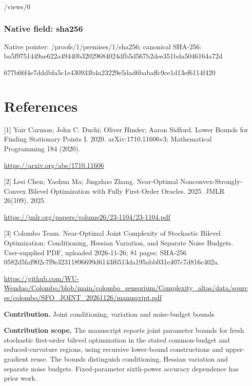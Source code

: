 \documentclass[10pt,a4paper]{article}
\begin{document}
/views/0


\subsubsection{Native field: sha256}


Native pointer: /proofs/1/premises/1/sha256; canonical SHA-256: ba5f9751449ae622a49440b3\allowbreak{}2029684024dfb5d567b2dee3\allowbreak{}51bda5046164a72d


677b66f4e7dddbfa5c1e4309\allowbreak{}33b4a23229e5dad6babaffc9\allowbreak{}ce1d13ef6114f420


\section{References}


[1] Yair Carmon; John C. Duchi; Oliver Hinder; Aaron Sidford. Lower Bounds for Finding Stationary Points I. 2020. arXiv:1710.11606v3; Mathematical Programming 184 (2020).



\url{https://arxiv.org/abs/1710.11606}



[2] Lesi Chen; Yaohua Ma; Jingzhao Zhang. Near-Optimal Nonconvex-Strongly-Convex Bilevel Optimization with Fully First-Order Oracles. 2025. JMLR 26(109), 2025.



\url{https://jmlr.org/papers/volume26/23-1104/23-1104.pdf}



[3] Colombo Team. Near-Optimal Joint Complexity of Stochastic Bilevel Optimization: Conditioning, Hessian Variation, and Separate Noise Budgets. User-supplied PDF, uploaded 2026-11-26; 81 pages; SHA-256 0582d5faf902c7f9e3231189\allowbreak{}6699d6143f6513da195abb03\allowbreak{}1e407c7d816c402a.



\url{https://github.com/WU-Wendao/Colombo/blob/main/colombo_sensorium/Complexity_altas/data/sources/colombo/SFO_JOINT_20261126/manuscript.pdf}



\textbf{Contribution.} Joint conditioning, variation and noise-budget bounds



\textbf{Contribution scope.} The manuscript reports joint parameter bounds for fresh stochastic first-order bilevel optimization in the stated common-budget and reduced-curvature regions, using recursive lower-bound constructions and upper-gradient reuse. The bounds distinguish conditioning, Hessian variation and separate noise budgets. Fixed-parameter sixth-power accuracy dependence has prior work.
\end{document}

